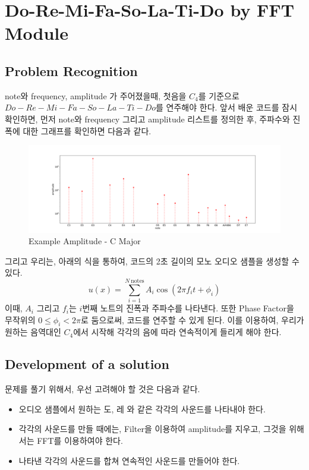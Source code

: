 \documentclass[11pt]{article}
\begin{document}
\section{Do-Re-Mi-Fa-So-La-Ti-Do by FFT Module}
\subsection{Problem Recognition} 
note와 frequency, amplitude 가 주어졌을때, 첫음을 $C_4$를 기준으로 $Do-Re-Mi-Fa-So-La-Ti-Do$를 연주해야 한다. 앞서 배운 코드를 잠시 확인하면, 먼저 note와 frequency 그리고 amplitude 리스트를 정의한 후,  주파수와 진폭에 대한 그래프를 확인하면 다음과 같다.
\begin{figure}[!ht]
  \centering
  \includegraphics[width=1\textwidth]{example_DO.pdf}
  \caption{Example Amplitude - C Major}
\end{figure}
그리고 우리는,  아래의 식을 통하여, 코드의 2초 길이의 모노 오디오 샘플을 생성할 수 있다.
\begin{equation}
u(x) = \sum_{i = 1}^{N\ \text{notes}} A_i \cos(2\pi f_i t + \phi_i)
\end{equation}
이때, $A_i$ 그리고 $f_i$는 $i$번째 노트의 진폭과 주파수를 나타낸다. 또한 Phase Factor을 무작위의 $0 \le \phi_i < 2\pi$로 둠으로써, 코드를 연주할 수 있게 된다. 이를 이용하여, 우리가 원하는 음역대인 $C_4$에서 시작해 각각의 음에 따라 연속적이게 들리게 해야 한다. 
\subsection{Development of a solution} 
문제를 풀기 위해서, 우선 고려해야 할 것은 다음과 같다.
\begin{itemize}
    \item 오디오 샘플에서 원하는 도, 레 와 같은 각각의 사운드를 나타내야 한다.
    	\item 각각의 사운드를 만들 때에는, Filter을 이용하여 amplitude를 지우고, 그것을 위해서는 FFT를 이용하여야 한다.
    \item 나타낸 각각의 사운드를 합쳐 연속적인 사운드를 만들어야 한다.
    
\end{itemize}
\end{document}
